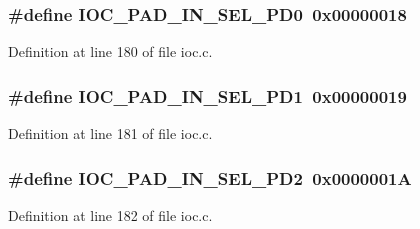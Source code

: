 \subsubsection[{\texorpdfstring{I\+O\+C\+\_\+\+P\+A\+D\+\_\+\+I\+N\+\_\+\+S\+E\+L\+\_\+\+P\+D0}{IOC_PAD_IN_SEL_PD0}}]{\setlength{\rightskip}{0pt plus 5cm}\#define I\+O\+C\+\_\+\+P\+A\+D\+\_\+\+I\+N\+\_\+\+S\+E\+L\+\_\+\+P\+D0~0x00000018}\hypertarget{group__ioc__api_ga718bc3d140c1203e4530a070d95cce21}{}\label{group__ioc__api_ga718bc3d140c1203e4530a070d95cce21}


Definition at line 180 of file ioc.\+c.

\subsubsection[{\texorpdfstring{I\+O\+C\+\_\+\+P\+A\+D\+\_\+\+I\+N\+\_\+\+S\+E\+L\+\_\+\+P\+D1}{IOC_PAD_IN_SEL_PD1}}]{\setlength{\rightskip}{0pt plus 5cm}\#define I\+O\+C\+\_\+\+P\+A\+D\+\_\+\+I\+N\+\_\+\+S\+E\+L\+\_\+\+P\+D1~0x00000019}\hypertarget{group__ioc__api_gae8813f984ad05062ff54e1a5399c9c24}{}\label{group__ioc__api_gae8813f984ad05062ff54e1a5399c9c24}


Definition at line 181 of file ioc.\+c.

\subsubsection[{\texorpdfstring{I\+O\+C\+\_\+\+P\+A\+D\+\_\+\+I\+N\+\_\+\+S\+E\+L\+\_\+\+P\+D2}{IOC_PAD_IN_SEL_PD2}}]{\setlength{\rightskip}{0pt plus 5cm}\#define I\+O\+C\+\_\+\+P\+A\+D\+\_\+\+I\+N\+\_\+\+S\+E\+L\+\_\+\+P\+D2~0x0000001A}\hypertarget{group__ioc__api_ga302356c73b38e941ae87c3a69c2facf9}{}\label{group__ioc__api_ga302356c73b38e941ae87c3a69c2facf9}


Definition at line 182 of file ioc.\+c.


